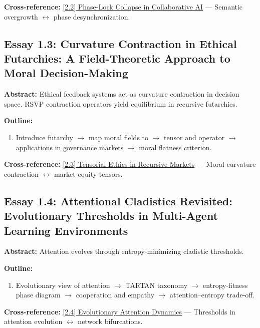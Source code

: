 \documentclass[12pt,a4paper]{article}
\begin{document}
\textbf{Cross-reference:} \hyperref[sec:essay2-2]{[2.2] Phase-Lock Collapse in Collaborative AI} --- Semantic overgrowth $\leftrightarrow$ phase desynchronization.

\subsection{Essay 1.3: Curvature Contraction in Ethical Futarchies: A Field-Theoretic Approach to Moral Decision-Making}
\label{sec:essay1-3}

\textbf{Abstract:} Ethical feedback systems act as curvature contraction in decision space. RSVP contraction operators yield equilibrium in recursive futarchies.

\textbf{Outline:}
\begin{enumerate}
\item Introduce futarchy $\to$ map moral fields to  $\to$ tensor  and operator  $\to$ applications in governance markets $\to$ moral flatness criterion.
\end{enumerate}

\textbf{Cross-reference:} \hyperref[sec:essay2-3]{[2.3] Tensorial Ethics in Recursive Markets} --- Moral curvature contraction $\leftrightarrow$ market equity tensors.

\subsection{Essay 1.4: Attentional Cladistics Revisited: Evolutionary Thresholds in Multi-Agent Learning Environments}
\label{sec:essay1-4}

\textbf{Abstract:} Attention evolves through entropy-minimizing cladistic thresholds.

\textbf{Outline:}
\begin{enumerate}
\item Evolutionary view of attention $\to$ TARTAN taxonomy $\to$ entropy-fitness phase diagram $\to$ cooperation and empathy $\to$ attention--entropy trade-off.
\end{enumerate}

\textbf{Cross-reference:} \hyperref[sec:essay2-4]{[2.4] Evolutionary Attention Dynamics} --- Thresholds in attention evolution $\leftrightarrow$ network bifurcations.
\end{document}
